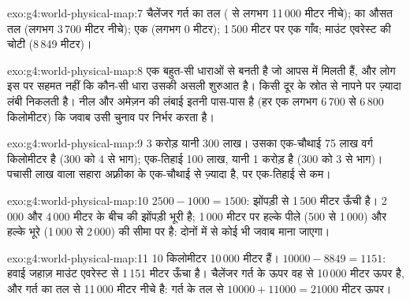 \begin{solution}{exo:g4:world-physical-map:7}
चैलेंजर गर्त का तल ( से लगभग 11\,000 मीटर नीचे);  का औसत तल
(लगभग 3\,700 मीटर नीचे); एक   (लगभग 0 मीटर); 1\,500 मीटर पर एक गाँव;
माउंट एवरेस्ट की चोटी
(8\,849 मीटर)।
\end{solution}

\begin{solution}{exo:g4:world-physical-map:8}
एक  बहुत-सी धाराओं से बनती है जो आपस में मिलती हैं, और लोग इस पर सहमत नहीं
कि कौन-सी धारा उसकी असली शुरुआत है। किसी दूर के स्रोत से नापने पर  ज़्यादा
लंबी निकलती है। नील और अमेज़न की लंबाई इतनी पास-पास है (हर एक लगभग 6\,700 से
6\,800 किलोमीटर) कि जवाब उसी चुनाव पर निर्भर करता है।
\end{solution}

\begin{solution}{exo:g4:world-physical-map:9}
3 करोड़ यानी 300 लाख। उसका एक-चौथाई 75 लाख वर्ग किलोमीटर है (300 को 4 से
भाग); एक-तिहाई 100 लाख, यानी 1 करोड़ है (300 को 3 से भाग)। पचासी लाख वाला
सहारा अफ़्रीका के एक-चौथाई से ज़्यादा है, पर एक-तिहाई से
कम।
\end{solution}

\begin{solution}{exo:g4:world-physical-map:10}
$2500 - 1000 = 1500$: झोंपड़ी  से 1\,500 मीटर ऊँची है। 2\,000 और 4\,000 मीटर के
बीच की झोंपड़ी भूरी है; 1\,000 मीटर पर  हल्के पीले (500 से 1\,000) और हल्के
भूरे (1\,000 से 2\,000) की सीमा पर है: दोनों में से कोई भी जवाब
माना जाएगा।
\end{solution}

\begin{solution}{exo:g4:world-physical-map:11}
10 किलोमीटर 10\,000 मीटर हैं। $10000 - 8849 = 1151$: हवाई जहाज़ माउंट एवरेस्ट से
1\,151 मीटर ऊँचा है। चैलेंजर गर्त के ऊपर वह  से 10\,000 मीटर ऊपर है, और
गर्त का तल  से 11\,000 मीटर नीचे है: गर्त के तल से
$10000 + 11000 = 21000$ मीटर
ऊपर।
\end{solution}
